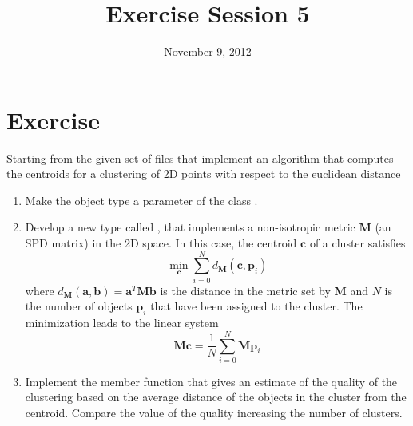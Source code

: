 \documentclass[10pt,a4paper]{article}
\title{Exercise Session 5}
\date{November 9, 2012}
\newcommand*{\vect}[1]{\boldsymbol{#1}}
\newcommand*{\mat}[1]{\boldsymbol{#1}}
\begin{document}
\lstset{language=[ISO]C++}
\maketitle

\section*{Exercise}

Starting from the given set of files that implement an algorithm that computes
the centroids for a clustering of 2D points with respect to the euclidean
distance

\begin{enumerate}

\item Make the object type a parameter of the class .

\item Develop a new  type called , that
implements a non-isotropic metric $\mat{M}$ (an SPD matrix) in the 2D space. In
this case, the centroid $\vect{c}$ of a cluster satisfies
\[
\min_{\vect{c}} \sum_{i=0}^N d_{\mat{M}}( \vect{c}, \vect{p}_i )
\]
where $d_{\mat{M}}( \vect{a}, \vect{b} ) = \vect{a}^T \mat{M} \vect{b}$ is
the distance in the metric set by $\mat{M}$ and $N$ is the number of objects
$\vect{p}_i$ that have been assigned to the cluster. The minimization leads to
the linear system
\[
\mat{M} \vect{c} = \frac{1}{N} \sum_{i=0}^N \mat{M} \vect{p}_i
\]


\item Implement the  member function that gives an estimate
of the quality of the clustering based on the average distance of the objects
in the cluster from the centroid. Compare the value of the quality increasing
the number of clusters.

\end{enumerate}

%
%
\end{document}

